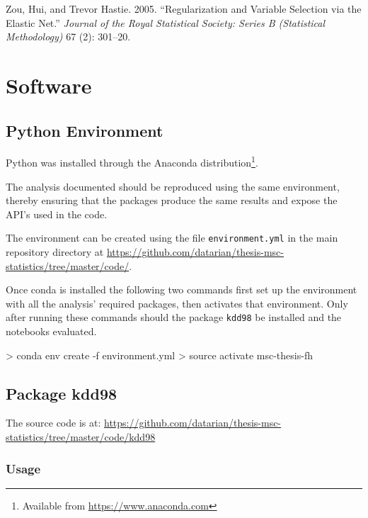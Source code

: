 \documentclass[
  11pt,
  a4paper,
  DIV=12,captions=tableheading,oneside,titlepage]{scrbook}
\let\oldverbatim\verbatim
\let\endoldverbatim\endverbatim
\renewenvironment{verbatim}{\footnotesize\oldverbatim}{\endoldverbatim}
\begin{document}
\leavevmode\hypertarget{ref-zou2005regularization}{}%
Zou, Hui, and Trevor Hastie. 2005. ``Regularization and Variable Selection via the Elastic Net.'' \emph{Journal of the Royal Statistical Society: Series B (Statistical Methodology)} 67 (2): 301--20.

\hypertarget{appendix-appendix}{%
\appendix}


\hypertarget{software}{%
\chapter{Software}\label{software}}

\hypertarget{python-environment}{%
\section{Python Environment}\label{python-environment}}

Python was installed through the Anaconda distribution\footnote{Available from \url{https://www.anaconda.com}}.

The analysis documented should be reproduced using the same environment, thereby ensuring that the packages produce the same results and expose the API's used in the code.

The environment can be created using the file \texttt{environment.yml} in the main repository directory at \url{https://github.com/datarian/thesis-msc-statistics/tree/master/code/}.

Once conda is installed the following two commands first set up the environment with all the analysis' required packages, then activates that environment. Only after running these commands should the package \texttt{kdd98} be installed and the notebooks evaluated.

\begin{verbatim}
> conda env create -f environment.yml
> source activate msc-thesis-fh
\end{verbatim}

\hypertarget{package-kdd98}{%
\section{Package kdd98}\label{package-kdd98}}

The source code is at: \url{https://github.com/datarian/thesis-msc-statistics/tree/master/code/kdd98}

\hypertarget{usage}{%
\subsection{Usage}\label{usage}}
\end{document}

